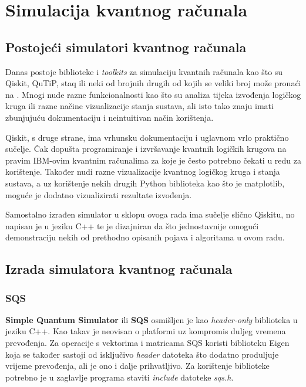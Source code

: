\chapter{Simulacija kvantnog računala}

\section{Postojeći simulatori kvantnog računala}

Danas postoje biblioteke i \emph{toolkits} za simulaciju kvantnih računala kao što su Qiskit, QuTiP, staq ili neki od brojnih drugih od kojih se veliki broj može pronaći na \citep{simulatori}.  Mnogi nude razne funkcionalnosti kao što su analiza tijeka izvođenja logičkog kruga ili razne načine vizualizacije stanja sustava, ali isto tako znaju imati zbunjujuću dokumentaciju i neintuitivan način korištenja.

Qiskit, s druge strane, ima vrhunsku dokumentaciju i uglavnom vrlo praktično sučelje. Čak dopušta programiranje i izvršavanje kvantnih logičkih krugova na pravim IBM-ovim kvantnim računalima za koje je često potrebno čekati u redu za korištenje. Također nudi razne vizualizacije kvantnog logičkog kruga i stanja sustava, a uz korištenje nekih drugih Python biblioteka kao što je matplotlib, moguće je dodatno vizualizirati rezultate izvođenja.

Samostalno izrađen simulator u sklopu ovoga rada ima sučelje slično Qiskitu, no napisan je u jeziku C++ te je dizajniran da što jednostavnije omogući demonstraciju nekih od prethodno opisanih pojava i algoritama u ovom radu.

\section{Izrada simulatora kvantnog računala}

\subsection{SQS}

\textbf{Simple Quantum Simulator} ili \textbf{SQS}  osmišljen je kao \emph{header-only} biblioteka u jeziku C++. Kao takav je neovisan o platformi uz kompromis duljeg vremena prevođenja. Za operacije s vektorima i matricama SQS koristi biblioteku Eigen \citep{eigen} koja se također sastoji od isključivo \emph{header} datoteka što dodatno produljuje vrijeme prevođenja, ali je ono i dalje prihvatljivo. Za korištenje biblioteke potrebno je u zaglavlje programa staviti \emph{include} datoteke \emph{sqs.h}.

